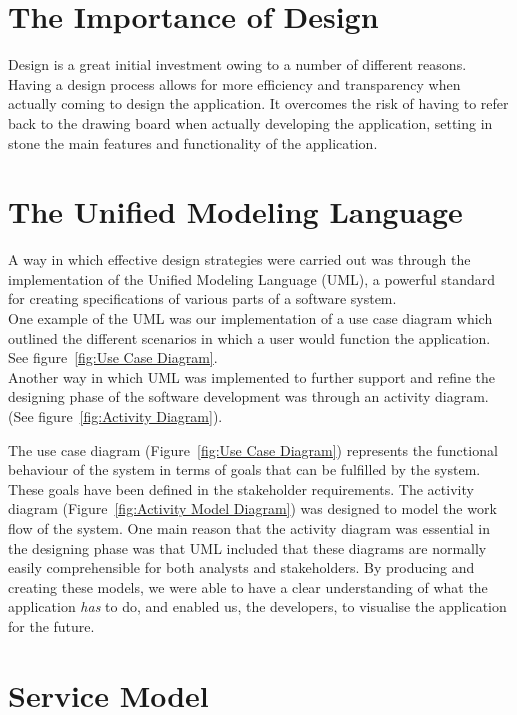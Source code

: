 \section{The Importance of Design}

Design is a great initial investment owing to a number of different reasons. Having a design process allows for more efficiency and transparency when actually coming to design the application. It overcomes the risk of having to refer back to the drawing board when actually developing the application, setting in stone the main features and functionality of the application.

\section{The Unified Modeling Language}

A way in which effective design strategies were carried out was through the implementation of the Unified Modeling Language (UML), a powerful standard for creating specifications of various parts of a software system.\\

One example of the UML was our implementation of a use case diagram which outlined the different scenarios in which a user would function the application. See figure~\ref{fig:Use Case Diagram}.\\

Another way in which UML was implemented to further support and refine the designing phase of the software development was through an activity diagram. (See figure~\ref{fig:Activity Diagram}).

The use case diagram (Figure~\ref{fig:Use Case Diagram}) represents the functional behaviour of the system in terms of goals that can be fulfilled by the system. These goals have been defined in the stakeholder requirements. The activity diagram (Figure~\ref{fig:Activity Model Diagram}) was designed to model the work flow of the system. One main reason that the activity diagram was essential in the designing phase was that UML included that these diagrams are normally easily comprehensible for both analysts and stakeholders. By producing and creating these models, we were able to have a clear understanding of what the application \textit{has} to do, and enabled us, the developers, to visualise the application for the future.

\section{Service Model}

